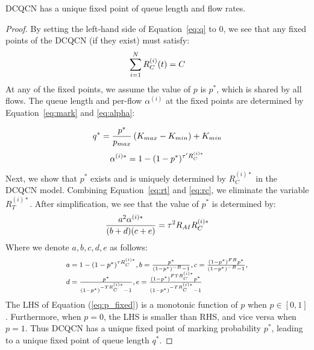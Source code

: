 \begin{thm}
DCQCN has a unique fixed point of queue length and flow rates. 
\end{thm}
\begin{proof}
By setting the left-hand side of Equation~\ref{eq:q} to 0,
we see that any fixed points of the DCQCN (if they exist) must
satisfy:
\begin{equation}
\small
\sum\limits_{i = 1}^N {R_C^{(i)}(t)} = C
\label{eq:fixedrc}
\end{equation}
At any of the fixed points, we assume the value of $p$ is $p^*$, which is shared
by all flows. The queue length and per-flow $\alpha^{(i)}$ at the fixed points
are determined by Equation~\ref{eq:mark} and \ref{eq:alpha}:

\begin{equation}
\small
{q^*} = \frac{{{p^*}}}{{{p_{max}}}}\left( {{K_{max}} - {K_{min}}} \right) + {K_{min}}
\end{equation}
\begin{equation}
\small
\alpha^{(i)*}  = 1 - {(1 - p^*)^{{\tau '}R_C^{(i)*}}}
\end{equation}
Next, we show that $p^*$ exists and is uniquely determined by $R_C^{(i)*}$ in
the DCQCN model. Combining Equation~\ref{eq:rt} and \ref{eq:rc}, 
we eliminate the variable $R_T^{(i)*}$. After simplification, we see that the value 
of $p^*$ is determined by:
\begin{equation}
\small
\frac{{{a^2}\alpha^{(i)*} }}{{(b + d)(c + e)}} = {\tau ^2}{R_{AI}}R_C^{(i)*}
\label{eq:p_fixed}
\end{equation}
Where we denote $a, b, c, d, e$ as follows:
\begin{equation}
\small
\begin{array}{l}
a = 1 - {(1 - p^*)^{\tau {R_C^{(i)*}}}},b = \frac{{p^*}}{{{{(1 - p^*)}^{ - B}} - 1}},c = \frac{{{{(1 - p^*)}^{FB}}p^*}}{{{{(1 - p^*)}^{ - B}} - 1}},\\
d = \frac{{p^*}}{{{{(1 - p^*)}^{ - T{R_C^{(i)*}}}} - 1}},e = \frac{{{{(1 - p^*)}^{FT{R_C^{(i)*}}}}p^*}}{{{{(1 - p^*)}^{ - T{R_C^{(i)*}}}} - 1}}
\end{array}
\end{equation}
The LHS of Equation (\ref{eq:p_fixed}) is a monotonic function of $p$ when $p \in [0,1]$.
Furthermore, when $p = 0$, the LHS is smaller than RHS, and vice versa when $p =
1$. Thus DCQCN has a unique fixed point of marking probability $p^*$, leading to
a unique fixed point of queue length $q^*$.


\end{proof}
